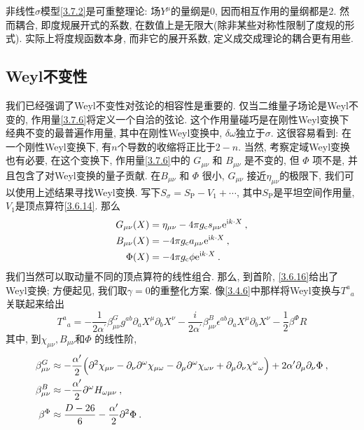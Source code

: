 非线性$\sigma$模型\eqref{3.7.2}是可重整理论: 场$Y^\mu$的量纲是0, 因而相互作用的量纲都是2. 然而耦合, 即度规展开式的系数, 在数值上是无限大(除非某些对称性限制了度规的形式). 实际上将度规函数本身, 而非它的展开系数, 定义成交成理论的耦合更有用些.

\subsection*{Weyl不变性}

我们已经强调了Weyl不变性对弦论的相容性是重要的. 仅当二维量子场论是Weyl不变的, 作用量\eqref{3.7.6}将定义一个自洽的弦论. 这个作用量碰巧是在刚性Weyl变换下经典不变的最普遍作用量, 其中在刚性Weyl变换中, $\delta \omega$独立于$\sigma$. 这很容易看到: 在一个刚性Weyl变换下, 有$n$个导数的收缩将正比于$2-n$. 当然, 考察定域Weyl变换也有必要, 在这个变换下, 作用量\eqref{3.7.6}中的 $G_{\mu \nu}$ 和 $B_{\mu \nu}$ 是不变的, 但 $\Phi$ 项不是, 并且包含了对Weyl变换的量子贡献. 在$B_{\mu \nu}$ 和 $\Phi$ 很小,  $G_{\mu \nu}$ 接近$\eta_{\mu \nu}$的极限下, 我们可以使用上述结果寻找Weyl变换. 写下$S_{\sigma}=S_{\mathrm{P}}-V_{1}+\cdots$, 其中$S_{\mathrm{P}}$是平坦空间作用量, 
$V_{1}$是顶点算符\eqref{3.6.14}. 那么
\begin{subequations} \label{3.7.11}
\begin{align}
G_{\mu \nu}(X)&=\eta_{\mu \nu}-4 \pi g_{\mathrm{c}} s_{\mu \nu} \mathrm{e}^{\mathrm{i} k \cdot X} \:, \label{3.7.11a} \\
B_{\mu \nu}(X)&=-4 \pi g_{\mathrm{c}} a_{\mu \nu} \mathrm{e}^{\mathrm{i} k \cdot X} \:, \label{3.7.11b} \\
\Phi(X)&=-4 \pi g_{\mathrm{c}} \phi \mathrm{e}^{\mathrm{i} k \cdot X} \:. \label{3.7.11c}
\end{align}
\end{subequations}
我们当然可以取动量不同的顶点算符的线性组合. 那么, 到首阶, \eqref{3.6.16}给出了Weyl变换; 方便起见, 我们取$\gamma=0$的重整化方案. 
像\eqref{3.4.6}中那样将Weyl变换与$T^{a}{}_{a}$关联起来给出
\begin{equation}
T^{a}{}_{a}=-\frac{1}{2 \alpha^{\prime}} \beta_{\mu \nu}^{G} g^{a b} \partial_{a} X^{\mu} \partial_{b} X^{\nu}-\frac{i}{2 \alpha^{\prime}} \beta_{\mu \nu}^{B} \epsilon^{a b} \partial_{a} X^{\mu} \partial_{b} X^{\nu}-\frac{1}{2} \beta^{\Phi} R
\end{equation}
其中, 到$\chi_{\mu \nu}, B_{\mu \nu}$和$\Phi$ 的线性阶,
\begin{subequations}\label{3.7.13}
\begin{align}
\beta_{\mu \nu}^{G} &\approx-\frac{\alpha^{\prime}}{2}\Bigl(\partial^{2} \chi_{\mu \nu}-\partial_{\nu} \partial^{\omega} \chi_{\mu \omega}-\partial_{\mu} \partial^{\omega} \chi_{\omega \nu}+\partial_{\mu} \partial_{\nu} \chi^{\omega}{}_{\omega}\Bigr)+2 \alpha^{\prime} \partial_{\mu} \partial_{\nu} \Phi \:,  \label{3.7.13a}\\
\beta_{\mu \nu}^{B} &\approx-\frac{\alpha^{\prime}}{2} \partial^{\omega} H_{\omega \mu \nu} \:, \label{3.7.13b}\\
\beta^{\Phi} & \approx \frac{D-26}{6}-\frac{\alpha^{\prime}}{2} \partial^{2} \Phi \:. \label{3.7.13c}
\end{align}
\end{subequations}
